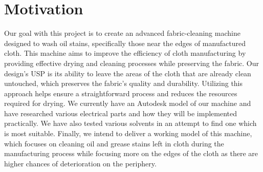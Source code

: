 \documentclass[table]{rapportCS}
\begin{document}
\section{Motivation}\label{sec:motivation} 
Our goal with this project is to create an advanced fabric-cleaning machine designed to wash oil stains, specifically those near the edges of manufactured cloth. This machine aims to improve the efficiency of cloth manufacturing by providing effective drying and cleaning processes while preserving the fabric. Our design’s USP is its ability to leave the areas of the cloth that are already clean untouched, which preserves the fabric’s quality and durability. Utilizing this approach helps ensure a straightforward process and reduces the resources required for drying. We currently have an Autodesk model of our machine and have researched various electrical parts and how they will be implemented practically. We have also tested various solvents in an attempt to find one which is most suitable. Finally, we intend to deliver a working model of this machine, which focuses on cleaning oil and grease stains left in cloth during the manufacturing process while focusing more on the edges of the cloth as there are higher chances of deterioration on the periphery.
\clearpage







\end{document}
